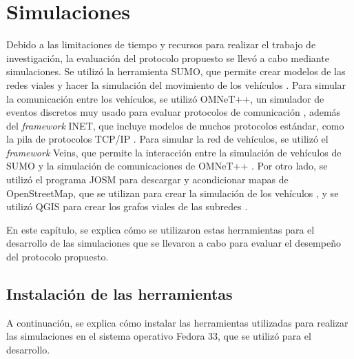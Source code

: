 ﻿%

\chapter{Simulaciones}

\label{ch:simulaciones}

Debido a las limitaciones de tiempo y recursos para realizar el trabajo de
investigación, la evaluación del protocolo propuesto se llevó a cabo mediante
simulaciones. Se utilizó la herramienta SUMO, que permite crear modelos de las
redes viales y hacer la simulación del movimiento de los vehículos \cite{SUMO}.
Para simular la comunicación entre los vehículos, se utilizó OMNeT++, un
simulador de eventos discretos muy usado para evaluar protocolos de
comunicación \cite{OMNeT}, además del \textit{framework} INET, que incluye
modelos de muchos protocolos estándar, como la pila de protocolos TCP/IP
\cite{INET}. Para simular la red de vehículos, se utilizó el \textit{framework}
Veins, que permite la interacción entre la simulación de vehículos de SUMO y la
simulación de comunicaciones de OMNeT++ \cite{Veins}. Por otro lado, se utilizó
el programa JOSM para descargar y acondicionar mapas de OpenStreetMap, que se
utilizan para crear la simulación de los vehículos \cite{OpenStreetMap}
\cite{JOSM}, y se utilizó QGIS para crear los grafos viales de las subredes
\cite{QGIS}.

En este capítulo, se explica cómo se utilizaron estas herramientas para el
desarrollo de las simulaciones que se llevaron a cabo para evaluar el desempeño
del protocolo propuesto.


\section{Instalación de las herramientas}

\label{sec:instalacion_herramientas}

A continuación, se explica cómo instalar las herramientas utilizadas para
realizar las simulaciones en el sistema operativo Fedora 33, que se utilizó
para el desarrollo.

